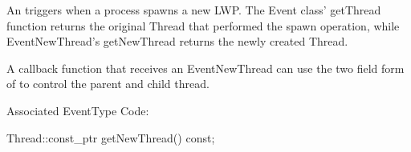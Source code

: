 
An  triggers when a process spawns a new LWP. The Event
class' getThread function returns the original Thread that performed the spawn
operation, while EventNewThread's getNewThread returns the newly created
Thread.

A callback function that receives an EventNewThread can use the two field form
of  to control the parent and child thread.

Associated EventType Code: 

\begin{apient}
Thread::const_ptr getNewThread() const;
\end{apient}

